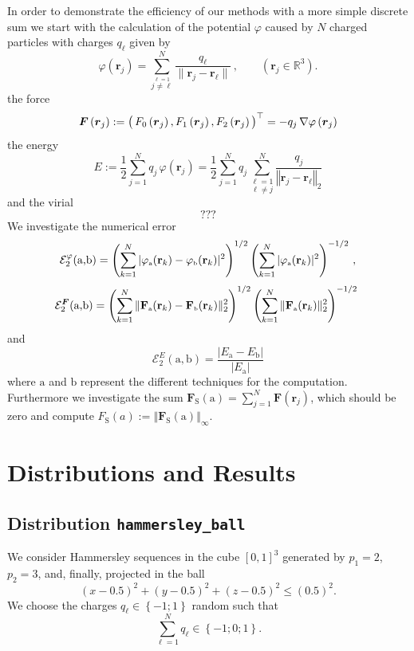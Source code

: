 In order to demonstrate the efficiency of our methods with a more
simple discrete sum we start with the calculation of the potential
$\varphi$ caused by $N$ charged particles with charges $q_\ell$ given
by
\[
  \varphi(\mathbf r_j) =
  \sum_{\overset{\ell=1}{j\not=\ell}}^{N} \frac{q_\ell}{\|\mathbf r_j-\mathbf
  r_{\ell}\|}\, , \qquad (\mathbf r_j\in {\mathbb R}^3). 
\]
the force
\[
  \boldsymbol{F}\left(\boldsymbol{r}_j\right) :=
  \left(\rule{0pt}{2.0ex}\, F_0\left(\boldsymbol{r}_j\right),F_1\left(\boldsymbol{r}_j\right), F_2\left(\boldsymbol{r}_j\right)\, \right)^\top =
  - q_j \, \nabla \varphi\left(\boldsymbol{r}_j\right)
\]
the energy
\[
  E := \frac{1}{2} \sum\limits_{j=1}^{N} q_j \,
  \varphi\left(\boldsymbol{r}_j\right) = 
  \frac{1}{2} \sum\limits_{j=1}^{N} q_j \, 
  \underset{\ell\neq j}{\sum\limits_{\ell=1}^{N}} 
  \frac{q_j}{\left\Vert \boldsymbol{r}_j - 
  \boldsymbol{r}_\ell \right\Vert_2}
\]
and the virial
\[
 ???
\]
We investigate the numerical error
\[
  \mathcal{E}^{\varphi}_{2}(\mbox{a,b}) = \left(\displaystyle \sum_{k=1}^{N} |\varphi_{\mbox{\tiny a}}
  (\mathbf r_k)-\varphi_{\mbox{\tiny b}}(\mathbf r_k)|^2\right)^{1/2}
  \left(\displaystyle\sum_{k=1}^{N}|\varphi_{\mbox{\tiny a}}(\mathbf r_k)|^2\right)^{-1/2}\, ,
\]
\[
  \mathcal{E}_{2}^{\boldsymbol F}(\mbox{a,b})
  = \left(\displaystyle
    \sum_{k=1}^{N} \|\mathbf F_{\mbox{\tiny a}}(\mathbf r_k)-\mathbf F_{\mbox{\tiny b}}(\mathbf r_k)\|^2_2\right)^{1/2}
    \left(\displaystyle\sum_{k=1}^{N}\|\mathbf F_{\mbox{\tiny a}}(\mathbf r_k) \|^2_2\right)^{-1/2}\;
\]
and
\[
  \mathcal{E}_{2}^{E}(\mathrm{a},\mathrm{b})
  = \frac{|E_{\mathrm{a}}-E_{\mathrm{b}}|}{|E_{\mathrm{a}}|}
\]
where $\mathrm{a}$ and $\mathrm{b}$ represent the different techniques
for the computation.  Furthermore we investigate the sum
$\boldsymbol{F}_\mathrm{S}(\mathrm{a}) = \sum_{j=1}^{N}
\boldsymbol{F}\left(\boldsymbol{r}_j\right)$, which should be zero and
compute $F_\mathrm{S}(a) := \left\Vert
  \boldsymbol{F}_\mathrm{S}(\mathrm{a}) \right\Vert_\infty$.

\section{Distributions and Results}
\label{sec:VertErg}
\subsection{Distribution \texttt{hammersley\_ball}}
We consider Hammersley sequences in the cube $\left[0 , 1 \right]^3$
generated by $p_1 = 2$, $p_2 = 3$, and, finally, projected in the ball
\[
(x-0.5)^2 + (y-0.5)^2 + (z-0.5)^2 \leq (0.5)^2.
\]
We choose the charges $q_\ell \in \left\lbrace -1 ; 1\right\rbrace$
random such that
\[
  \sum\limits_{\ell=1}^{N} q_\ell \in \left\lbrace -1 ; 0; 1\right\rbrace.
\]

